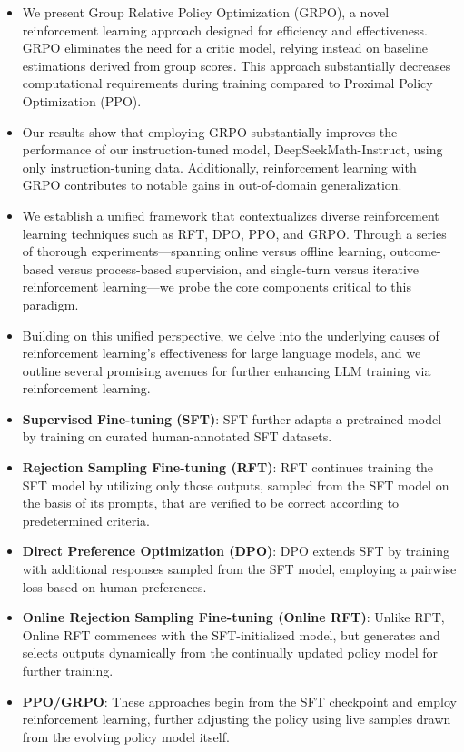 \begin{itemize}[topsep=0pt]
    \item We present Group Relative Policy Optimization (GRPO), a novel reinforcement learning approach designed for efficiency and effectiveness. GRPO eliminates the need for a critic model, relying instead on baseline estimations derived from group scores. This approach substantially decreases computational requirements during training compared to Proximal Policy Optimization (PPO).
    \item Our results show that employing GRPO substantially improves the performance of our instruction-tuned model, DeepSeekMath-Instruct, using only instruction-tuning data. Additionally, reinforcement learning with GRPO contributes to notable gains in out-of-domain generalization.
    \item We establish a unified framework that contextualizes diverse reinforcement learning techniques such as RFT, DPO, PPO, and GRPO. Through a series of thorough experiments—spanning online versus offline learning, outcome-based versus process-based supervision, and single-turn versus iterative reinforcement learning—we probe the core components critical to this paradigm.
    \item Building on this unified perspective, we delve into the underlying causes of reinforcement learning's effectiveness for large language models, and we outline several promising avenues for further enhancing LLM training via reinforcement learning.
\end{itemize}

\begin{itemize}
    \item \textbf{Supervised Fine-tuning (SFT)}: SFT further adapts a pretrained model by training on curated human-annotated SFT datasets.
    \item \textbf{Rejection Sampling Fine-tuning (RFT)}: RFT continues training the SFT model by utilizing only those outputs, sampled from the SFT model on the basis of its prompts, that are verified to be correct according to predetermined criteria.
    \item \textbf{Direct Preference Optimization (DPO)}: DPO extends SFT by training with additional responses sampled from the SFT model, employing a pairwise loss based on human preferences.
    \item \textbf{Online Rejection Sampling Fine-tuning (Online RFT)}: Unlike RFT, Online RFT commences with the SFT-initialized model, but generates and selects outputs dynamically from the continually updated policy model for further training.
    \item \textbf{PPO/GRPO}: These approaches begin from the SFT checkpoint and employ reinforcement learning, further adjusting the policy using live samples drawn from the evolving policy model itself.
\end{itemize}


